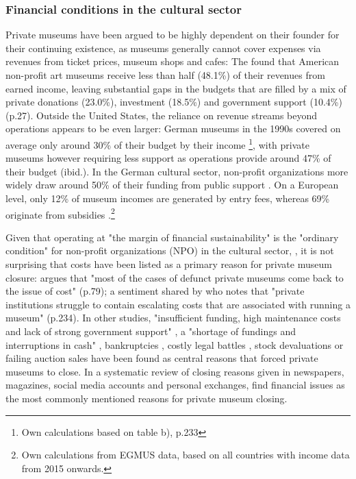 \documentclass[12pt]{article}
\begin{document}
\subsubsection*{Financial conditions in the cultural sector}


Private museums have been argued to be highly dependent on their founder for their continuing existence, as museums generally cannot cover expenses via revenues from ticket prices, museum shops and cafes:
The \textcite{IMLS_2008_funding} found that American non-profit art museums receive less than half (48.1\%) of their revenues from earned income, leaving substantial gaps in the budgets that are filled by a mix of private donations (23.0\%), investment (18.5\%) and government support (10.4\%) (p.27).
Outside the United States, the reliance on revenue streams beyond operations appears to be even larger:
German museums in the 1990s covered on average only around 30\% of their budget by their income \parencite{Martin_1993_museen}\footnote{Own calculations based on table b), p.233}, with private museums however requiring less support as operations provide around 47\% of their budget (ibid.).
In the German cultural sector, non-profit organizations more widely draw around 50\% of their funding from public support \parencite[p.82]{Zimmer_Priller_2007_gemeinnuetzig}.
On a European level, only 12\% of museum incomes are generated by entry fees, whereas 69\% originate from subsidies \parencite{EGMUS_2024_complete}.\footnote{Own calculations from EGMUS data, based on all countries with income data from 2015 onwards.}


Given that operating at "the margin of financial sustainability" is the "ordinary condition" for non-profit organizations (NPO) in the cultural sector, \parencite[p.2]{Licci_BaraldiBonini_2024_sustainability}, it is not surprising that costs have been listed as a primary reason for private museum closure:
\textcite{Adam_2021_rise} argues that "most of the cases of defunct private museums come back to the issue of cost" (p.79); a sentiment shared by \textcite{Walker_2019_collector} who notes that "private institutions struggle to contain escalating costs that are associated with running a museum" (p.234).
In other studies, "insufficient funding, high maintenance costs and lack of strong government support" \parencite[p.7]{Zennaro_2017_shanghai}, a "shortage of fundings and interruptions in cash" \parencite[p.45]{Song_2008_private}, bankruptcies \parencite{Velthuis_Gera_2024_fragility,DeNigris_2018_museums}, costly legal battles \parencite{Velthuis_Gera_2024_fragility}, stock devaluations \parencite{Walker_2019_collector} or failing auction sales \parencite{Bechtler_Imhof_2018_future} have been found as central reasons that forced private museums to close.
In a systematic review of closing reasons given in newspapers, magazines, social media accounts and personal exchanges, \textcite{Velthuis_Gera_2024_fragility} find financial issues as the most commonly mentioned reasons for private museum closing.
\end{document}
